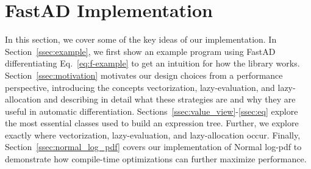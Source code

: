 \section{FastAD Implementation}\label{sec:fastad}

In this section, we cover some of the key ideas of our implementation\footnotemark.
In Section~\ref{ssec:example}, we first show an example program using FastAD
differentiating Eq.~\ref{eq:f-example} to get an intuition for how the library works.
Section~\ref{ssec:motivation} motivates our design choices from a performance perspective, 
introducing the concepts vectorization, lazy-evaluation, and lazy-allocation and
describing in detail what these strategies are and
why they are useful in automatic differentiation.
Sections~\ref{ssec:value_view}-\ref{ssec:eq} explore the most essential classes
used to build an expression tree.
Further, we explore exactly where vectorization, lazy-evaluation, and lazy-allocation occur.
Finally, Section~\ref{ssec:normal_log_pdf} covers our implementation of
Normal log-pdf to demonstrate how compile-time optimizations 
can further maximize performance.























